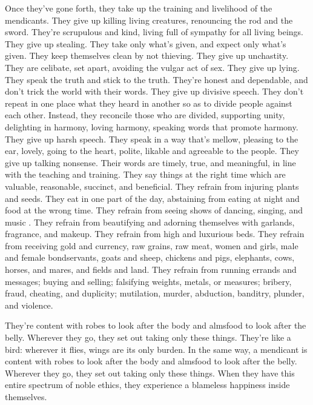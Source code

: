\documentclass[12pt,openany]{book}%
\begin{document}
Once they’ve gone forth, they take up the training and livelihood of the mendicants. They give up killing living creatures, renouncing the rod and the sword. They’re scrupulous and kind, living full of sympathy for all living beings. They give up stealing. They take only what’s given, and expect only what’s given. They keep themselves clean by not thieving. They give up unchastity. They are celibate, set apart, avoiding the vulgar act of sex. They give up lying. They speak the truth and stick to the truth. They’re honest and dependable, and don’t trick the world with their words. They give up divisive speech. They don’t repeat in one place what they heard in another so as to divide people against each other. Instead, they reconcile those who are divided, supporting unity, delighting in harmony, loving harmony, speaking words that promote harmony. They give up harsh speech. They speak in a way that’s mellow, pleasing to the ear, lovely, going to the heart, polite, likable and agreeable to the people. They give up talking nonsense. Their words are timely, true, and meaningful, in line with the teaching and training. They say things at the right time which are valuable, reasonable, succinct, and beneficial. They refrain from injuring plants and seeds. They eat in one part of the day, abstaining from eating at night and food at the wrong time. They refrain from seeing shows of dancing, singing, and music . They refrain from beautifying and adorning themselves with garlands, fragrance, and makeup. They refrain from high and luxurious beds. They refrain from receiving gold and currency, raw grains, raw meat, women and girls, male and female bondservants, goats and sheep, chickens and pigs, elephants, cows, horses, and mares, and fields and land. They refrain from running errands and messages; buying and selling; falsifying weights, metals, or measures; bribery, fraud, cheating, and duplicity; mutilation, murder, abduction, banditry, plunder, and violence. 

They’re content with robes to look after the body and almsfood to look after the belly. Wherever they go, they set out taking only these things. They’re like a bird: wherever it flies, wings are its only burden. In the same way, a mendicant is content with robes to look after the body and almsfood to look after the belly. Wherever they go, they set out taking only these things. When they have this entire spectrum of noble ethics, they experience a blameless happiness inside themselves. 
\end{document}
